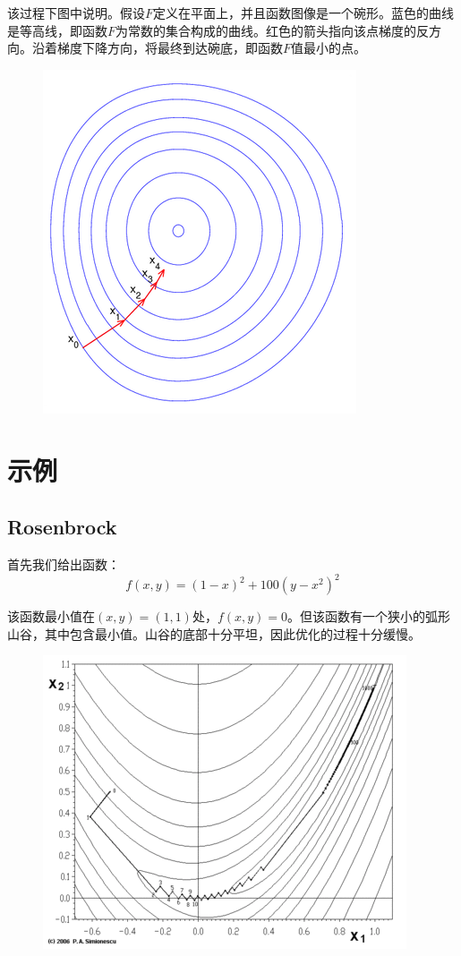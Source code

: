 \documentclass[12pt,a4paper]{article}
\begin{document}
该过程下图中说明。假设$F$定义在平面上，并且函数图像是一个碗形。蓝色的曲线是等高线，即函数$F$为常数的集合构成的曲线。红色的箭头指向该点梯度的反方向。沿着梯度下降方向，将最终到达碗底，即函数$F$值最小的点。
\begin{figure}[H]
\centering
\includegraphics[scale=0.5]{./figures/figure_1.png}
\end{figure}

\section{示例}
\subsection{Rosenbrock}
首先我们给出函数：
\begin{equation}
	f(x,y)=(1-x)^2+100(y-x^2)^2
\end{equation}

该函数最小值在$(x,y)=(1,1)$处，$f(x,y)=0$。但该函数有一个狭小的弧形山谷，其中包含最小值。山谷的底部十分平坦，因此优化的过程十分缓慢。

\begin{figure}[H]
\centering
\includegraphics[scale=0.5]{./figures/figure_2.png}
\end{figure}
\end{document}
